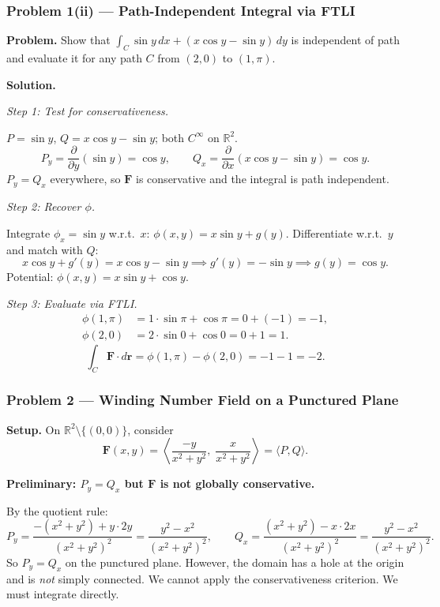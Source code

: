 \documentclass[11pt]{article}
\begin{document}
\subsubsection*{Problem 1(ii) --- Path-Independent Integral via FTLI}

\textbf{Problem.}
Show that $\int_C \sin y\,dx + (x\cos y - \sin y)\,dy$ is independent of path and evaluate it for any path $C$ from $(2,0)$ to $(1,\pi)$.

\medskip
\textbf{Solution.}

\textit{Step 1: Test for conservativeness.}

$P = \sin y$, $Q = x\cos y - \sin y$; both $C^\infty$ on $\mathbb{R}^2$.
\[
  P_y = \frac{\partial}{\partial y}(\sin y) = \cos y,
  \qquad
  Q_x = \frac{\partial}{\partial x}(x\cos y - \sin y) = \cos y.
\]
$P_y = Q_x$ everywhere, so $\mathbf{F}$ is conservative and the integral is path independent.

\textit{Step 2: Recover $\phi$.}

Integrate $\phi_x = \sin y$ w.r.t.\ $x$: $\phi(x,y) = x\sin y + g(y)$.
Differentiate w.r.t.\ $y$ and match with $Q$:
\[
  x\cos y + g'(y) = x\cos y - \sin y
  \implies g'(y) = -\sin y \implies g(y) = \cos y.
\]
Potential: $\phi(x,y) = x\sin y + \cos y$.

\textit{Step 3: Evaluate via FTLI.}
\begin{align*}
  \phi(1,\pi) &= 1\cdot\sin\pi + \cos\pi = 0 + (-1) = -1, \\
  \phi(2,0)   &= 2\cdot\sin 0 + \cos 0 = 0 + 1 = 1.
\end{align*}
\[
  \int_C \mathbf{F}\cdot d\mathbf{r}
  = \phi(1,\pi) - \phi(2,0) = -1 - 1 = \boxed{-2}.
\]

\bigskip
\subsubsection*{Problem 2 --- Winding Number Field on a Punctured Plane}

\textbf{Setup.}
On $\mathbb{R}^2\setminus\{(0,0)\}$, consider
\[
  \mathbf{F}(x,y)
  = \left\langle \frac{-y}{x^2+y^2},\;\frac{x}{x^2+y^2} \right\rangle
  = \langle P, Q \rangle.
\]

\textbf{Preliminary: $P_y = Q_x$ but $\mathbf{F}$ is not globally conservative.}

By the quotient rule:
\[
  P_y
  = \frac{-(x^2+y^2) + y\cdot 2y}{(x^2+y^2)^2}
  = \frac{y^2-x^2}{(x^2+y^2)^2},
  \qquad
  Q_x
  = \frac{(x^2+y^2) - x\cdot 2x}{(x^2+y^2)^2}
  = \frac{y^2-x^2}{(x^2+y^2)^2}.
\]
So $P_y = Q_x$ on the punctured plane. However, the domain has a hole at the origin and is \emph{not} simply connected. We cannot apply the conservativeness criterion. We must integrate directly.
\end{document}
